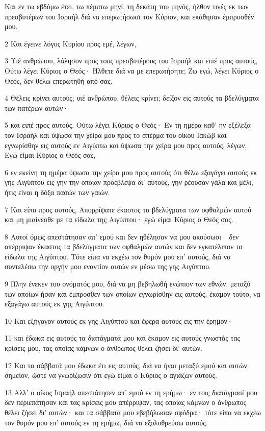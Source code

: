 \par Και εν τω εβδόμω έτει, τω πέμπτω μηνί, τη δεκάτη του μηνός, ήλθον τινές εκ των πρεσβυτέρων του Ισραήλ διά να επερωτήσωσι τον Κύριον, και εκάθησαν έμπροσθέν μου.
\par 2 Και έγεινε λόγος Κυρίου προς εμέ, λέγων,
\par 3 Υιέ ανθρώπου, λάλησον προς τους πρεσβυτέρους του Ισραήλ και ειπέ προς αυτούς, Ούτω λέγει Κύριος ο Θεός· Ήλθετε διά να με επερωτήσητε; Ζω εγώ, λέγει Κύριος ο Θεός, δεν θέλω επερωτηθή από σας.
\par 4 Θέλεις κρίνει αυτούς; υιέ ανθρώπου, θέλεις κρίνει; δείξον εις αυτούς τα βδελύγματα των πατέρων αυτών·
\par 5 και ειπέ προς αυτούς, Ούτω λέγει Κύριος ο Θεός· Εν τη ημέρα καθ' ην εξέλεξα τον Ισραήλ και ύψωσα την χείρα μου προς το σπέρμα του οίκου Ιακώβ και εγνωρίσθην εις αυτούς εν Αιγύπτω και ύψωσα την χείρα μου προς αυτούς, λέγων, Εγώ είμαι Κύριος ο Θεός σας,
\par 6 εν εκείνη τη ημέρα ύψωσα την χείρα μου προς αυτούς ότι θέλω εξαγάγει αυτούς εκ γης Αιγύπτου εις γην την οποίαν προέβλεψα δι' αυτούς, γην ρέουσαν γάλα και μέλι, ήτις είναι η δόξα πασών των γαιών.
\par 7 Και είπα προς αυτούς, Απορρίψατε έκαστος τα βδελύγματα των οφθαλμών αυτού και μη μιαίνεσθε με τα είδωλα της Αιγύπτου· εγώ είμαι Κύριος ο Θεός σας.
\par 8 Αυτοί όμως απεστάτησαν απ' εμού και δεν ηθέλησαν να μου ακούσωσι· δεν απέρριψαν έκαστος τα βδελύγματα των οφθαλμών αυτών και δεν εγκατέλιπον τα είδωλα της Αιγύπτου. Τότε είπα να εκχέω τον θυμόν μου επ' αυτούς, διά να συντελέσω την οργήν μου εναντίον αυτών εν μέσω της γης Αιγύπτου.
\par 9 Πλην ένεκεν του ονόματός μου, διά να μη βεβηλωθή ενώπιον των εθνών, μεταξύ των οποίων ήσαν και έμπροσθεν των οποίων εγνωρίσθην εις αυτούς, έκαμον τούτο, να εξαγάγω αυτούς εκ γης Αιγύπτου.
\par 10 Και εξήγαγον αυτούς εκ γης Αιγύπτου και έφερα αυτούς εις την έρημον·
\par 11 και έδωκα εις αυτούς τα διατάγματά μου και έκαμον εις αυτούς γνωστάς τας κρίσεις μου, τας οποίας κάμνων ο άνθρωπος θέλει ζήσει δι' αυτών.
\par 12 Και τα σάββατά μου έδωκα έτι εις αυτούς, διά να ήναι μεταξύ εμού και αυτών σημείον, ώστε να γνωρίζωσιν ότι εγώ είμαι ο Κύριος ο αγιάζων αυτούς.
\par 13 Αλλ' ο οίκος Ισραήλ απεστάτησεν απ' εμού εν τη ερήμω· εν τοις διατάγμασί μου δεν περιεπάτησαν και τας κρίσεις μου απέρριψαν, τας οποίας κάμνων ο άνθρωπος θέλει ζήσει δι' αυτών· και τα σάββατά μου εβεβήλωσαν σφόδρα· τότε είπα να εκχέω τον θυμόν μου επ' αυτούς εν τη ερήμω, διά να εξολοθρεύσω αυτούς.
